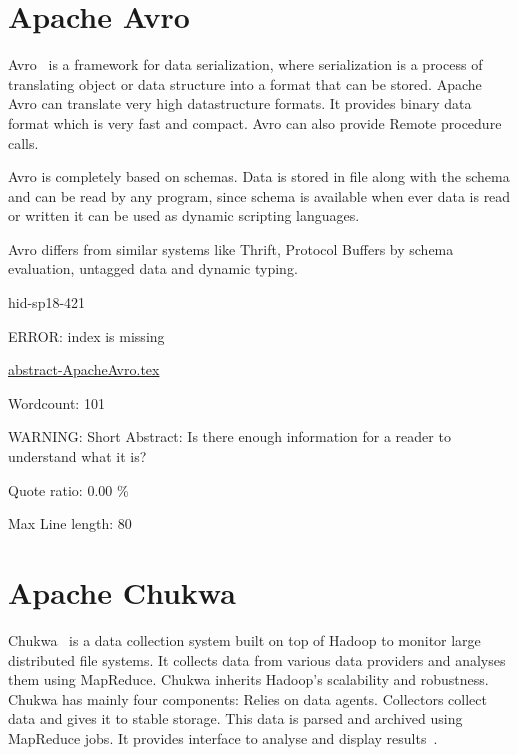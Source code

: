 \section{Apache Avro}

Avro~\cite{hid-sp18-421-AvroCloud} is a framework for data serialization, where
serialization is a process of translating object or data structure into a format
that can be stored. Apache Avro can translate very high datastructure formats.
It provides binary data format which is very fast and compact. Avro can also
provide Remote procedure calls.

Avro is completely based on schemas. Data is stored in file along with the
schema and can be read by any program, since schema is available when ever data
is read or written it can be used as dynamic scripting languages.

Avro differs from similar systems like Thrift, Protocol Buffers by schema
evaluation, untagged data and dynamic typing.



\begin{IU}

hid-sp18-421

ERROR: index is missing

\href{https://github.com/cloudmesh-community/hid-sp18-421/blob/master//technology/abstract-ApacheAvro.tex}{abstract-ApacheAvro.tex}

 

Wordcount: 101

WARNING: Short Abstract: Is there enough information for a reader to understand what it is?


Quote ratio: 0.00 \%
 
Max Line length: 80
\end{IU}

\section{Apache Chukwa}

Chukwa~\cite{hid-sp-421-ChukwaCloud} is a data collection system built on top of
Hadoop to monitor large distributed file systems. It collects data from various
data providers and analyses them using MapReduce. Chukwa inherits Hadoop’s
scalability and robustness. Chukwa has mainly four components: Relies on data
agents. Collectors collect data and gives it to stable storage. This data is
parsed and archived using MapReduce jobs. It provides interface to analyse and
display results~\cite{hid-sp-421-ChukwaComponents}.




